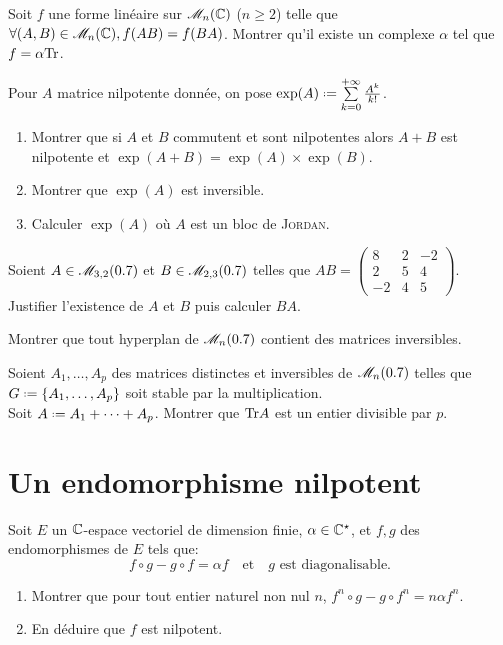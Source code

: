\begin{exercice}
    Soit $f$ une forme linéaire sur $\mathscr{M}_n(\mathbb{C})$ ($n\geqslant2$) telle que $\forall (A, B) \in \mathscr{M}_n(\mathbb{C}), f(AB) = f(BA)$. Montrer qu'il existe un complexe $\alpha$ tel que $f = \alpha \mathrm{Tr}$.
\end{exercice}

\begin{exercice}
    Pour $A$ matrice nilpotente donnée, on pose $\exp(A) \defeq \sum\limits_{k=0}^{+\infty} \frac{A^k}{k!}$.
    \begin{enumerate}
        \item Montrer que si $A$ et $B$ commutent et sont nilpotentes alors $A+B$ est nilpotente et $\exp(A+B) = \exp(A) \times \exp(B)$.
        \item Montrer que $\exp(A)$ est inversible.
        \item Calculer $\exp(A)$ où $A$ est un bloc de \textsc{Jordan}.
    \end{enumerate}
\end{exercice}

\begin{exercice}
    Soient $A \in \mathscr{M}_{3, 2}(0.7)$ et $B \in \mathscr{M}_{2, 3}(0.7)$ telles que $AB = 
    \begin{pmatrix}
        8 & 2 & -2 \\
        2 & 5 & 4 \\
        -2 & 4 & 5
    \end{pmatrix}
    $. Justifier l'existence de $A$ et $B$ puis calculer $BA$.
\end{exercice}

\begin{exercice}
    Montrer que tout hyperplan de $\mathscr{M}_n(0.7)$ contient des matrices inversibles.
\end{exercice}

\begin{exercice}
    Soient $A_1, \dots, A_p$ des matrices distinctes et inversibles de $\mathscr{M}_n(0.7)$ telles que $G \defeq \{ A_1, \dots, A_p \}$ soit stable par la multiplication. \\
    Soit $A \defeq A_1 + \cdots + A_p$. Montrer que $\mathrm{Tr} A$ est un entier divisible par $p$.
\end{exercice}

\section{Un endomorphisme nilpotent}

\begin{exercice}
    Soit $E$ un $\mathbb{C}$-espace vectoriel de dimension finie, $\alpha \in \mathbb{C}^\star$, et $f, g$ des endomorphismes de $E$ tels que:
    $$f \circ g - g \circ f = \alpha f \quad \text{et} \quad g \text{ est diagonalisable}.$$
    \begin{enumerate}
        \item Montrer que pour tout entier naturel non nul $n$, $f^n \circ g - g \circ f^n = n \alpha f^n$.
        \item En déduire que $f$ est nilpotent. 
    \end{enumerate}
\end{exercice}